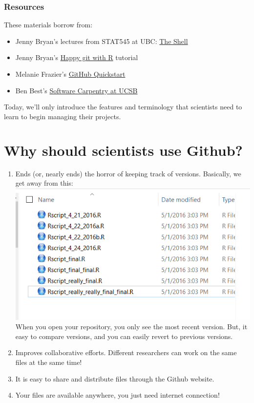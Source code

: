 \documentclass[]{book}
\providecommand{\tightlist}{%
  \setlength{\itemsep}{0pt}\setlength{\parskip}{0pt}}
\theoremstyle{definition}
\theoremstyle{definition}
\theoremstyle{definition}
\theoremstyle{remark}
\begin{document}
\subsubsection{Resources}\label{resources}

These materials borrow from:

\begin{itemize}
\tightlist
\item
  Jenny Bryan's lectures from STAT545 at UBC:
  \href{http://stat545.com/git09_shell.html}{The Shell}
\item
  Jenny Bryan's \href{http://happygitwithr.com}{Happy git with R}
  tutorial
\item
  Melanie Frazier's
  \href{https://rawgit.com/nazrug/Quickstart/master/GithubQuickstart.html}{GitHub
  Quickstart}
\item
  Ben Best's
  \href{http://remi-daigle.github.io/2016-04-15-UCSB/git/}{Software
  Carpentry at UCSB}
\end{itemize}

Today, we'll only introduce the features and terminology that scientists
need to learn to begin managing their projects.

\section{Why should scientists use
Github?}\label{why-should-scientists-use-github}

\begin{enumerate}
\def\labelenumi{\arabic{enumi}.}
\tightlist
\item
  Ends (or, nearly ends) the horror of keeping track of versions.
  Basically, we get away from this: \includegraphics{img/MessySaves.png}
  When you open your repository, you only see the most recent version.
  But, it easy to compare versions, and you can easily revert to
  previous versions. 
\item
  Improves collaborative efforts. Different researchers can work on the
  same files at the same time!
\item
  It is easy to share and distribute files through the Github website.
\item
  Your files are available anywhere, you just need internet connection!
\end{enumerate}
\end{document}
